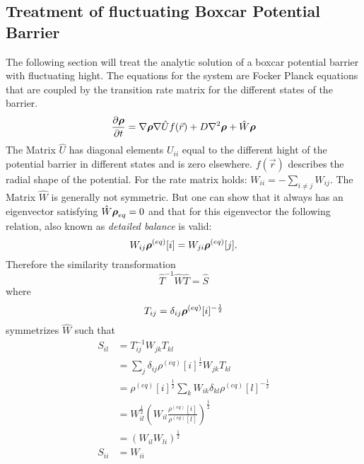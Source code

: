 \subsection{Treatment of fluctuating Boxcar Potential Barrier}

The following section will treat the analytic solution of a boxcar potential barrier with fluctuating hight. The equations for the system are Focker Planck equations that are coupled by the transition rate matrix for the different states of the barrier.
\begin{equation}
    \frac{\partial \boldsymbol{\mathbf{\rho}}}{\partial t} = \nabla \boldsymbol{\mathbf{\rho}} \nabla \hat{U} f(\vec{r}) + D\nabla^2\boldsymbol{\mathbf{\rho}} + \hat{W} \boldsymbol{\mathbf{\rho}} 
    \label{Rection_Diffusion}
\end{equation}
The Matrix $\hat{U}$ has diagonal elements $U_{ii}$ equal to the different hight of the potential barrier in different states and is zero elsewhere. $f(\vec{r})$ describes the radial shape of the potential. For the rate matrix holds: $W_{ii} = -\sum_{i \ne j} W_{ij}$. The Matrix $\hat{W}$ is generally not symmetric. But one can show that it always has an eigenvector satisfying $\hat{W} \boldsymbol{\mathbf{\rho}}_{eq} = 0$ and that for this eigenvector the following relation, also known as {\it detailed balance} is valid:
\begin{equation}
    W_{ij} \boldsymbol{\mathbf{\rho}}^{(eq)}[i] = W_{ji} \boldsymbol{\mathbf{\rho}}^{(eq)}[j].
    \label{detailled_ballance}
\end{equation}
Therefore the similarity transformation
\begin{equation}
    \hat{T}^{-1}\hat{W}\hat{T} = \hat{S}
\end{equation}
where
\begin{equation}
    T_{ij} =\delta_{ij} \boldsymbol{\mathbf{\rho}}^{(eq)}[i]^{-\frac{1}{2}}
    \label{similarity_transform}
\end{equation}
symmetrizes $\hat{W}$ such that
\begin{align}
    S_{il} &= T^{-1}_{ij} W_{jk} T_{kl} \\ \nonumber
    &= \sum_j \delta_{ij} \rho^{(eq)}[i]^{\frac{1}{2}} W_{jk} T_{kl} \\ \nonumber
    &= \rho^{(eq)}[i]^{\frac{1}{2}} \sum_{k} W_{ik} \delta_{kl} \rho^{(eq)}[l]^{-\frac{1}{2}} \\ \nonumber
    &= W_{il}^{\frac{1}{2}} \left( W_{il} \frac{\rho^{(eq)}[i]}{\rho^{(eq)}[l]} \right)^{\frac{1}{2}} \\ \nonumber
    &= \left(W_{il} W_{li}\right)^{\frac{1}{2}} \\ \nonumber
    S_{ii} &= W_{ii} 
\end{align}
